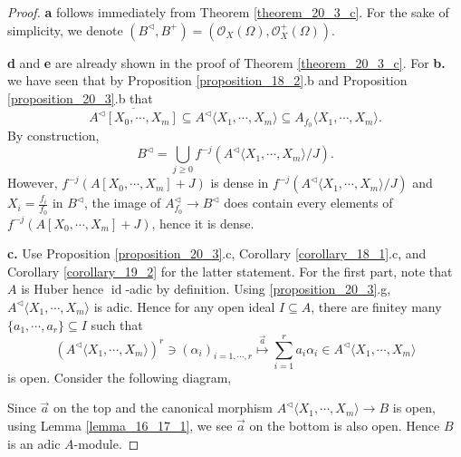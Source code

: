 \documentclass[8pt]{article}
\numberwithin{equation}{section}
\DeclareMathOperator{\id}{id}
\newcommand{\cO}[0]{\mathcal{O}}
\newcommand{\comppol}[1]{\langle X_1,\cdots, X_{#1}\rangle}
\begin{document}
\begin{proof}
    \textbf{a} follows immediately from Theorem \ref{theorem_20_3_c}. For the sake of simplicity, we denote $(B^\triangleleft,B^+)=(\cO_X(\Omega),\cO^+_X(\Omega))$.
    \par\textbf{d} and \textbf{e} are already shown in the proof of Theorem \ref{theorem_20_3_c}. For \textbf{b.} we have seen that by Proposition \ref{proposition_18_2}.b and Proposition \ref{proposition_20_3}.b that 
    \begin{equation*}
        \overline{A^\triangleleft[X_0,\cdots,X_m]}\subseteq A^\triangleleft\comppol{m}\subseteq A_{f_0}\comppol{m}.
    \end{equation*}
    By construction,
    \begin{equation*}
        B^\triangleleft = \bigcup_{j\geq0}f^{-j}(A^\triangleleft\comppol{m}/J).
    \end{equation*}
    However, $f^{-j}(A[X_0,\cdots,X_m]+J)$ is dense in $f^{-j}(A^\triangleleft\comppol{m}/J)$ and $X_i = {\frac {f_i} {f_0}}$ in $B^\triangleleft$, the image of $A_{f_0}^\triangleleft \to B^\triangleleft$ does contain every elements of $f^{-j}(A[X_0,\cdots,X_m]+J)$, hence it is dense.
    \par\textbf{c.} Use Proposition \ref{proposition_20_3}.c, Corollary \ref{corollary_18_1}.c, and Corollary \ref{corollary_19_2} for the latter statement. For the first part, note that $A$ is Huber hence $\id$-adic by definition. Using \ref{proposition_20_3}.g, $A^\triangleleft\comppol{m}$ is adic. Hence for any open ideal $I\subseteq A$, there are finitey many $\{a_1,\cdots,a_r\}\subseteq I$ such that 
    \begin{equation*}
        (A^\triangleleft\comppol{m})^r\ni(\alpha_i)_{i=1,\cdots,r}\stackrel{\vec{a}}{\mapsto} \sum_{i=1}^r a_i\alpha_i\in A^\triangleleft\comppol{m}
    \end{equation*}
    is open. Consider the following diagram,
    \begin{center}
    \end{center}
    Since $\vec{a}$ on the top and the canonical morphism $A^\triangleleft\comppol{m}\to B$ is open, using Lemma \ref{lemma_16_17_1}, we see $\vec{a}$ on the bottom is also open. Hence $B$ is an adic $A$-module.
\end{proof}
\end{document}
